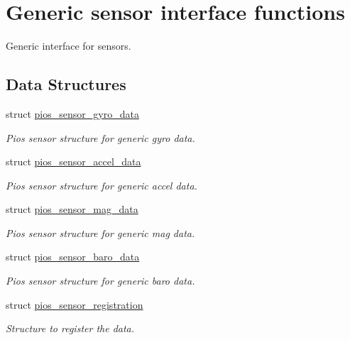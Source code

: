 \hypertarget{group___p_i_o_s___s_e_n_s_o_r_s}{\section{Generic sensor interface functions}
\label{group___p_i_o_s___s_e_n_s_o_r_s}
}


Generic interface for sensors.  


\subsection*{Data Structures}
\begin{DoxyCompactItemize}
\item 
struct \hyperlink{structpios__sensor__gyro__data}{pios\-\_\-sensor\-\_\-gyro\-\_\-data}
\begin{DoxyCompactList}\small\item\em Pios sensor structure for generic gyro data. \end{DoxyCompactList}\item 
struct \hyperlink{structpios__sensor__accel__data}{pios\-\_\-sensor\-\_\-accel\-\_\-data}
\begin{DoxyCompactList}\small\item\em Pios sensor structure for generic accel data. \end{DoxyCompactList}\item 
struct \hyperlink{structpios__sensor__mag__data}{pios\-\_\-sensor\-\_\-mag\-\_\-data}
\begin{DoxyCompactList}\small\item\em Pios sensor structure for generic mag data. \end{DoxyCompactList}\item 
struct \hyperlink{structpios__sensor__baro__data}{pios\-\_\-sensor\-\_\-baro\-\_\-data}
\begin{DoxyCompactList}\small\item\em Pios sensor structure for generic baro data. \end{DoxyCompactList}\item 
struct \hyperlink{structpios__sensor__registration}{pios\-\_\-sensor\-\_\-registration}
\begin{DoxyCompactList}\small\item\em Structure to register the data. \end{DoxyCompactList}\end{DoxyCompactItemize}
